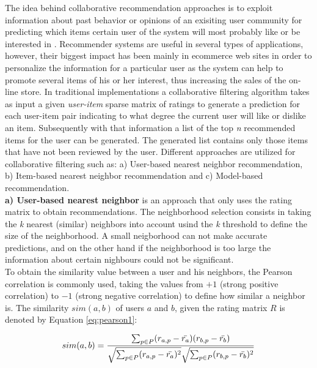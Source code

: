 The idea behind collaborative recommendation approaches is to exploit
information about past behavior or opinions of an exisiting user
community for predicting which items certain user of the system will
most probably like or be interested in \cite{jannach2010recommender}. 
Recommender systems are useful in several types of  applications,
however, their biggest impact has been mainly in ecommerce web sites
in order to personalize the information for a particular user as the
system can help to promote several items of his or her interest, thus
increasing the sales of the on-line store. In traditional
implementations a collaborative filtering algorithm takes as
input a given \textit{user-item} sparse matrix of ratings to generate a
prediction for each user-item pair indicating to what degree the
current user will like or dislike an item. Subsequently with that
information a list of the top \textit{n} recommended items for the
user can be generated. The generated list contains only those items
that have not been reviewed by the user. Different approaches are
utilized for collaborative filtering such as: a) User-based nearest 
neighbor recommendation, b) Item-based nearest neighbor 
recommendation and c) Model-based recommendation.\\
\textbf{a) User-based nearest neighbor} is an approach that only 
uses the rating matrix to obtain recommendations. 
The neighborhood selection consists in taking
the \textit{k} nearest (similar) neighbors into account usind the 
\textit{k} threshold to define the size of the neighborhood. A small 
neigborhood can not make accurate predictions, and on the 
other hand if the neighborhood
is too large the information about certain nighbours could not be
significant.\\ To obtain the similarity value between a user and his
neighbors, the Pearson correlation is commonly used, taking
the values from $+1$ (strong positive correlation) to $-1$ (strong
negative correlation) to define how similar a neighbor is. The
similarity $sim(a,b)$ of users $a$ and $b$, given the rating matrix
$R$ is denoted by Equation \ref{eq:pearson1}:

\begin{equation}\label{eq:pearson1}
\displaystyle sim(a,b) = {\sum_{p \in P}(r_{a,p} - 
\bar{r_a})(r_{b,p}- \bar{r_b}) 
\over \sqrt{\sum_{p \in P}(r_{a,p} - \bar{r_a})^2} 
\sqrt{\sum_{p \in P} 
(r_{b,p}- \bar{r_b})^2}}
\end{equation}

